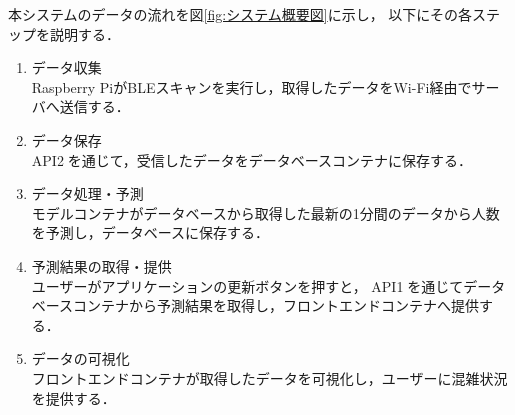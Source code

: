 本システムのデータの流れを図\ref{fig:システム概要図}に示し，
以下にその各ステップを説明する．
\begin{enumerate}
	\item データ収集　\\
	Raspberry PiがBLEスキャンを実行し，取得したデータをWi-Fi経由でサーバへ送信する．
	
	\item データ保存 \\
	API\textcircled{2}を通じて，受信したデータをデータベースコンテナに保存する．
	
	\item データ処理・予測 \\
	モデルコンテナがデータベースから取得した最新の1分間のデータから人数を予測し，データベースに保存する．
	
	\item 予測結果の取得・提供 \\
	ユーザーがアプリケーションの更新ボタンを押すと，
	API\textcircled{1}を通じてデータベースコンテナから予測結果を取得し，フロントエンドコンテナへ提供する．
	
	\item データの可視化 \\
	フロントエンドコンテナが取得したデータを可視化し，ユーザーに混雑状況を提供する．
\end{enumerate}
